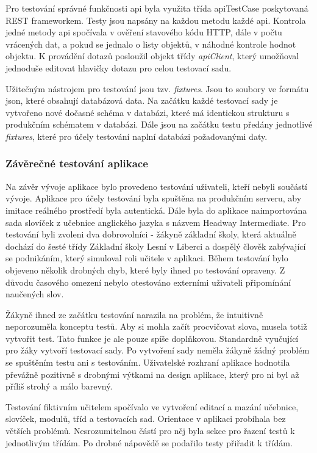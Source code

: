 \documentclass[a4paper,11pt,titlepage,fleqn]{article}
\begin{document}
        Pro testování správné funkčnosti \gls{api} byla využita třída \gls{api}TestCase poskytovaná REST frameworkem. Testy jsou napsány na každou metodu každé \gls{api}. Kontrola jedné metody \gls{api} spočívala v ověření stavového kódu HTTP, dále v počtu vrácených dat, a pokud se jednalo o listy objektů, v náhodné kontrole hodnot objektu. K provádění dotazů posloužil objekt třídy \textit{\gls{api}Client}, který umožňoval jednoduše editovat hlavičky dotazu pro celou testovací sadu. 

        Užitečným nástrojem pro testování jsou tzv. \textit{fixtures}. Jsou to soubory ve formátu \gls{json}, které obsahují databázová data. Na začátku každé testovací sady je vytvořeno nové dočasné schéma v databázi, které má identickou strukturu s produkčním schématem v databázi. Dále jsou na začátku testu předány jednotlivé \textit{fixtures}, které pro účely testování naplní databázi požadovanými daty.

        \subsubsection{Závěrečné testování aplikace}
            Na závěr vývoje aplikace bylo provedeno testování uživateli, kteří nebyli součástí vývoje. Aplikace pro účely testování byla spuštěna na produkčním serveru, aby imitace reálného prostředí byla autentická. Dále byla do aplikace naimportována sada slovíček z učebnice anglického jazyka s názvem Headway Intermediate. Pro testování byli zvoleni dva dobrovolníci - žákyně základní školy, která aktuálně dochází do šesté třídy Základní školy Lesní v Liberci a dospělý člověk zabývající se podnikáním, který simuloval roli učitele v aplikaci. Během testování bylo objeveno několik drobných chyb, které byly ihned po testování opraveny. Z důvodu časového omezení nebylo otestováno externími uživateli připomínání naučených slov.

            Žákyně ihned ze začátku testování narazila na problém, že intuitivně neporozuměla konceptu testů. Aby si mohla začít procvičovat slova, musela totiž vytvořit test. Tato funkce je ale pouze spíše doplňkovou. Standardně vyučující pro žáky vytvoří testovací sady. Po vytvoření sady neměla žákyně žádný problém se spuštěním testu ani s testováním. Uživatelské rozhraní aplikace hodnotila převážně pozitivně s  drobnými výtkami na design aplikace, který pro ni byl až příliš strohý a málo barevný.

            Testování fiktivním učitelem spočívalo ve vytvoření editací a mazání učebnice, slovíček, modulů, tříd a testovacích sad. Orientace v aplikaci probíhala bez větších problémů. Nesrozumitelnou částí pro něj byla sekce pro řazení testů k jednotlivým třídám. Po drobné nápovědě se podařilo testy přiřadit k třídám.
\end{document}
